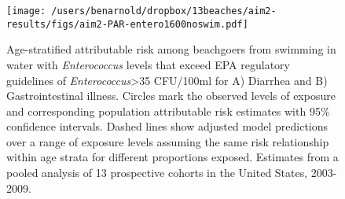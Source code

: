 \documentclass[11pt]{article}
\begin{document}
\begin{figure}[htbp]
\begin{center}
\texttt{[image: /users/benarnold/dropbox/13beaches/aim2-results/figs/aim2-PAR-entero1600noswim.pdf]} 
\begin{minipage}{0.5\textwidth}
\caption{Age-stratified attributable risk among beachgoers from swimming in water with \textit{Enterococcus} levels that exceed EPA regulatory guidelines of \textit{Enterococcus}>35 CFU/100ml for A) Diarrhea and B) Gastrointestinal illness.  Circles mark the observed levels of exposure and corresponding population attributable risk estimates with 95\% confidence intervals. Dashed lines show adjusted model predictions over a range of exposure levels assuming the same risk relationship within age strata for different proportions exposed. Estimates from a pooled analysis of 13 prospective cohorts in the United States, 2003-2009.}
\label{fig:enteroPAR}
\end{minipage}
\end{center}
\end{figure}
\end{document}

